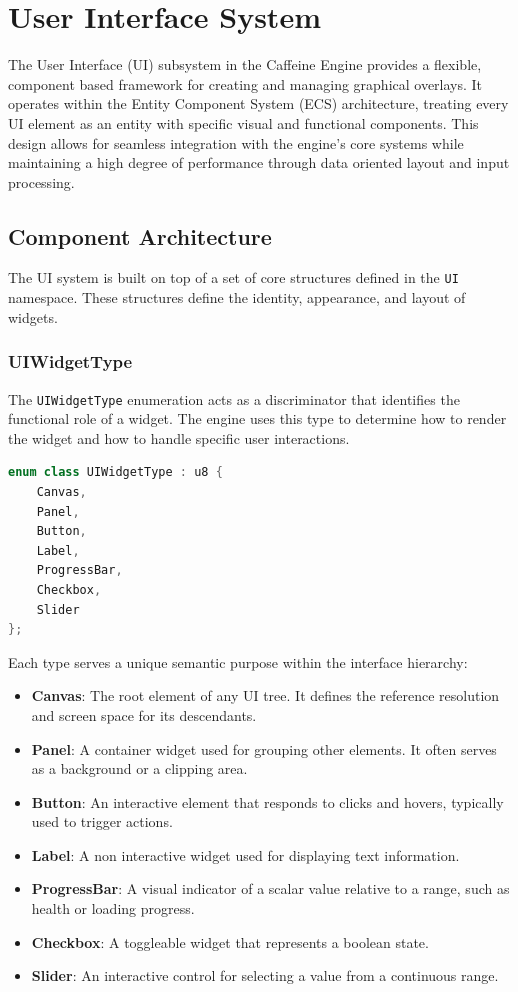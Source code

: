 \chapter{User Interface System}

The User Interface (UI) subsystem in the Caffeine Engine provides a flexible, component based framework for creating and managing graphical overlays. It operates within the Entity Component System (ECS) architecture, treating every UI element as an entity with specific visual and functional components. This design allows for seamless integration with the engine's core systems while maintaining a high degree of performance through data oriented layout and input processing.

\section{Component Architecture}

The UI system is built on top of a set of core structures defined in the \texttt{UI} namespace. These structures define the identity, appearance, and layout of widgets.

\subsection{UIWidgetType}

The \texttt{UIWidgetType} enumeration acts as a discriminator that identifies the functional role of a widget. The engine uses this type to determine how to render the widget and how to handle specific user interactions.

\begin{lstlisting}[language=C++]
enum class UIWidgetType : u8 {
    Canvas,
    Panel,
    Button,
    Label,
    ProgressBar,
    Checkbox,
    Slider
};
\end{lstlisting}

Each type serves a unique semantic purpose within the interface hierarchy:
\begin{itemize}
    \item \textbf{Canvas}: The root element of any UI tree. It defines the reference resolution and screen space for its descendants.
    \item \textbf{Panel}: A container widget used for grouping other elements. It often serves as a background or a clipping area.
    \item \textbf{Button}: An interactive element that responds to clicks and hovers, typically used to trigger actions.
    \item \textbf{Label}: A non interactive widget used for displaying text information.
    \item \textbf{ProgressBar}: A visual indicator of a scalar value relative to a range, such as health or loading progress.
    \item \textbf{Checkbox}: A toggleable widget that represents a boolean state.
    \item \textbf{Slider}: An interactive control for selecting a value from a continuous range.
\end{itemize}

